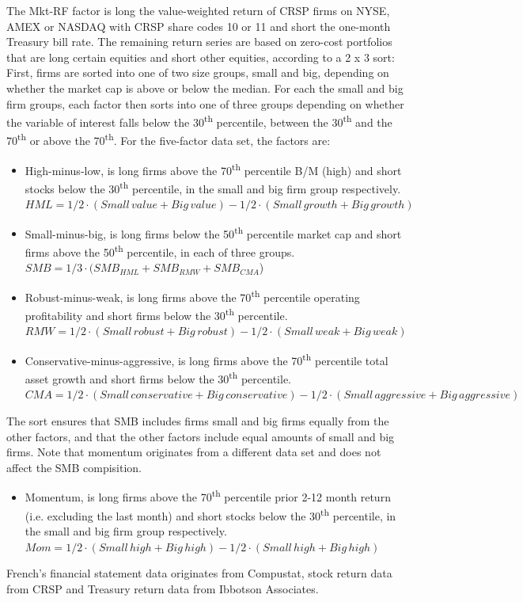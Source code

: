 The Mkt-RF factor is long the value-weighted return of CRSP firms on NYSE, AMEX or NASDAQ with CRSP share codes 10 or 11 and short the one-month Treasury bill rate. The remaining return series are based on zero-cost portfolios that are long certain equities and short other equities, according to a 2 x 3 sort: First, firms are sorted into one of two size groups, small and big, depending on whether the market cap is above or below the median. For each the small and big firm groups, each factor then sorts into one of three groups depending on whether the variable of interest falls below the 30\textsuperscript{th} percentile, between the 30\textsuperscript{th} and the 70\textsuperscript{th} or above the 70\textsuperscript{th}. For the five-factor data set, the factors are:
\begin{itemize}
  \item High-minus-low, is long firms above the 70\textsuperscript{th} percentile B/M (high) and short stocks below the 30\textsuperscript{th} percentile, in the small and big firm group respectively. \\
  $HML = 1/2 \cdot (Small\,value + Big\,value) - 1/2 \cdot (Small\,growth + Big\,growth)$
  \item Small-minus-big, is long firms below the 50\textsuperscript{th} percentile market cap and short firms above the 50\textsuperscript{th} percentile, in each of three groups. \\
  $SMB = 1/3 \cdot (SMB_{HML} + SMB_{RMW} + SMB_{CMA}$)
  \item Robust-minus-weak, is long firms above the 70\textsuperscript{th} percentile operating profitability and short firms below the 30\textsuperscript{th} percentile. \\
  $RMW = 1/2 \cdot (Small\,robust + Big\,robust) - 1/2 \cdot (Small\,weak + Big\,weak)$
  \item Conservative-minus-aggressive, is long firms above the 70\textsuperscript{th} percentile total asset growth and short firms below the 30\textsuperscript{th} percentile. \\
  $CMA = 1/2 \cdot (Small\,conservative + Big\,conservative) - 1/2 \cdot (Small\,aggressive + Big\,aggressive)$
\end{itemize}
The sort ensures that SMB includes firms small and big firms equally from the other factors, and that the other factors include equal amounts of small and big firms. Note that momentum originates from a different data set and does not affect the SMB compisition.
\begin{itemize}
  \item Momentum, is long firms above the 70\textsuperscript{th} percentile prior 2-12 month return (i.e. excluding the last month) and short stocks below the 30\textsuperscript{th} percentile, in the small and big firm group respectively. \\
  $Mom = 1/2 \cdot (Small\,high + Big\,high) - 1/2 \cdot (Small\,high + Big\,high)$
\end{itemize}
French's financial statement data originates from Compustat, stock return data from CRSP and Treasury return data from Ibbotson Associates.

